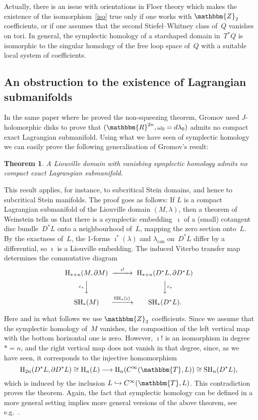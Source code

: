 \documentclass[12pt,twoside]{amsart}
\theoremstyle{plain}
\newtheorem{theorem}{Theorem}[section]
\numberwithin{figure}{section}
\numberwithin{equation}{section}
\def\can{\operatorname{can}}
\def\H{\operatorname{H}}
\def\SH{\operatorname{SH}}
\def\RR{\mathbbm{R}}
\def\TT{\mathbbm{T}}
\def\ZZ{\mathbbm{Z}}
\begin{document}
Actually, there is an issue with orientations in Floer theory which makes the existence of the 
isomorphism~\eqref{iso} true only if one works with $\ZZ_2$ coefficients, or if one assumes that the second Stiefel--Whitney class of~$Q$ vanishes on tori. In general, the symplectic homology of a starshaped domain in~$T^* Q$ is isomorphic to the singular homology of the free loop space 
of~$Q$ with a suitable local system of coefficients. 

\subsection{An obstruction to the existence of Lagrangian submanifolds} 


In the same paper \cite{Gro85} where he proved the non-squeezing theorem, Gromov used $J$-holomorphic disks to prove 
that $(\RR^{2n},\omega_0=d\lambda_0)$ admits no compact exact Lagrangian submanifold. 
Using what we have seen of symplectic homology we can easily prove the following generalisation of Gromov's result:

\begin{theorem}
A Liouville domain with vanishing symplectic homology admits no compact exact Lagrangian submanifold.
\end{theorem}

This result applies, for instance, to subcritical Stein domains, and hence to subcritical Stein manifolds. The proof goes as follows: If $L$ is a compact Lagrangian submanifold of the Liouville domain $(M,\lambda)$, 
then a theorem of Weinstein tells us that there is 
a symplectic embedding~$\imath$ of a (small) cotangent disc bundle~$D^*L$ onto a neighbourhood of~$L$, 
mapping the zero section onto~$L$. By the exactness of~$L$, the 1-forms
$\imath^*(\lambda)$ and $\lambda_{\can}$ on~$D^*L$ differ by a differential, so $\imath$ is a Liouville embedding. The induced Viterbo transfer map determines the commutative diagram
\begin{eqnarray} \label{e:diaVit}
\begin{CD}
\H_{*+n}(M,\partial M) @>\imath !>> \H_{*+n}(D^*L,\partial D^*L) \\ @V{c_*}VV @VV{c_*}V \\ \SH_*(M) @>{\SH_*(\imath)\,}>> \SH_*(D^*L). 
\end{CD}
\end{eqnarray}


Here and in what follows we use $\ZZ_2$ coefficients. 
Since we assume that the symplectic homology of~$M$ vanishes, 
the composition of the left vertical map with the bottom horizontal one is zero. 
However, $\imath !$ is an isomorphism in degree~$*=n$, 
and the right vertical map does not vanish in that degree, since, as we have seen, 
it corresponds to the injective homomorphism
\[
\H_{2n}(D^*L,\partial D^*L) \cong \H_n(L) \longrightarrow \H_n(C^{\infty}(\TT,L)) \cong \SH_n(D^*L),
\] 
which is induced by the inclusion $L \hookrightarrow C^{\infty}(\TT,L)$.
This contradiction proves the theorem. Again, the fact that symplectic homology 
can be defined in a more general setting implies more general versions of 
the above theorem, see e.g.\ \cite[Theorem 4.3]{vit99}.
\end{document}
